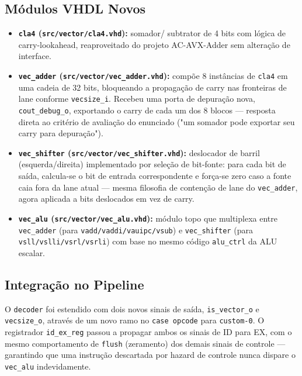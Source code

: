 \documentclass[12pt, a4paper]{article}
\newcommand{\code}[1]{\texttt{#1}}
\begin{document}
\subsection{Módulos VHDL Novos}

\begin{itemize}[leftmargin=2em]
  \item \textbf{\code{cla4} (\code{src/vector/cla4.vhd}):} somador/
    subtrator de 4 bits com lógica de carry-lookahead, reaproveitado do
    projeto AC-AVX-Adder sem alteração de interface.
  \item \textbf{\code{vec\_adder} (\code{src/vector/vec\_adder.vhd}):}
    compõe 8 instâncias de \code{cla4} em uma cadeia de 32 bits,
    bloqueando a propagação de carry nas fronteiras de lane conforme
    \code{vecsize\_i}. Recebeu uma porta de depuração nova,
    \code{cout\_debug\_o}, exportando o carry de cada um dos 8 blocos ---
    resposta direta ao critério de avaliação do enunciado ("um somador
    pode exportar seu carry para depuração").
  \item \textbf{\code{vec\_shifter} (\code{src/vector/vec\_shifter.vhd}):}
    deslocador de barril (esquerda/direita) implementado por seleção de
    bit-fonte: para cada bit de saída, calcula-se o bit de entrada
    correspondente e força-se zero caso a fonte caia fora da lane atual
    --- mesma filosofia de contenção de lane do \code{vec\_adder}, agora
    aplicada a bits deslocados em vez de carry.
  \item \textbf{\code{vec\_alu} (\code{src/vector/vec\_alu.vhd}):}
    módulo topo que multiplexa entre \code{vec\_adder} (para
    \code{vadd/vaddi/vauipc/vsub}) e \code{vec\_shifter} (para
    \code{vsll/vslli/vsrl/vsrli}) com base no mesmo código
    \code{alu\_ctrl} da ALU escalar.
\end{itemize}

\subsection{Integração no Pipeline}

O \code{decoder} foi estendido com dois novos sinais de saída,
\code{is\_vector\_o} e \code{vecsize\_o}, através de um novo ramo no
\code{case opcode} para \code{custom-0}. O registrador \code{id\_ex\_reg}
passou a propagar ambos os sinais de ID para EX, com o mesmo
comportamento de \code{flush} (zeramento) dos demais sinais de controle
--- garantindo que uma instrução descartada por hazard de controle nunca
dispare o \code{vec\_alu} indevidamente.
\end{document}
